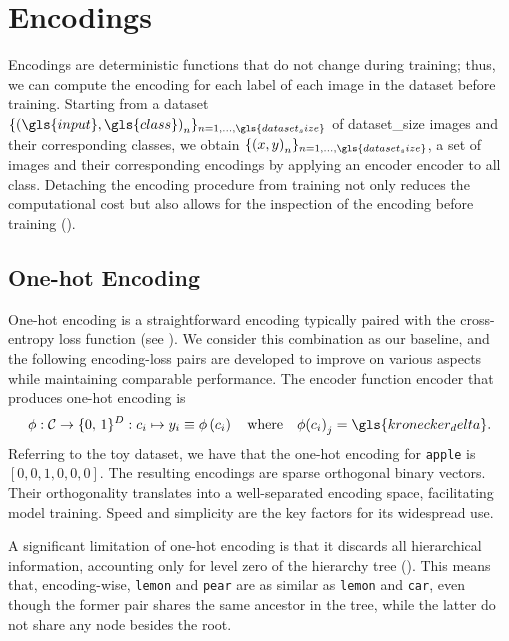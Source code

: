 \section{Encodings}
\label{sec:encodings}

Encodings are deterministic functions that do not change during training; thus, we can compute the encoding for each label of each image in the dataset before training. Starting from a dataset $\{ \left(\gls{input}, \gls{class}\right)_n \}_{n = 1, \ldots, \gls{dataset_size}}$ of \gls{dataset_size} images and their corresponding classes, we obtain $\{ \left(x, y\right)_n \}_{n = 1, \ldots, \gls{dataset_size}}$, a set of images and their corresponding encodings by applying an encoder \gls{encoder} to all \gls{class}.
Detaching the encoding procedure from training not only reduces the computational cost but also allows for the inspection of the encoding before training ().

\subsection{One-hot Encoding}
\label{subsec:one-hot-encoding}

One-hot encoding is a straightforward encoding typically paired with the cross-entropy loss function (see ). We consider this combination as our baseline, and the following encoding-loss pairs are developed to improve on various aspects while maintaining comparable performance.
The encoder function \gls{encoder} that produces one-hot encoding is
\begin{equation}
  \phi: \mathcal{C} \to \{0, \,1\}^{D}
      : c_i \mapsto y_i \equiv \phi \left(c_i\right)
  \quad \text{where} \quad
  \phi{\left(c_i\right)}_j = \gls{kronecker_delta}.
  \label{eq:one-hot-encoding}
\end{equation}
Referring to the toy dataset, we have that the one-hot encoding for \texttt{apple} is $\left[0, 0, 1, 0, 0, 0\right]$. The resulting encodings are sparse orthogonal binary vectors. Their orthogonality translates into a well-separated encoding space, facilitating model training. Speed and simplicity are the key factors for its widespread use.

A significant limitation of one-hot encoding is that it discards all hierarchical information, accounting only for level zero of the hierarchy tree (). This means that, encoding-wise, \texttt{lemon} and \texttt{pear} are as similar as \texttt{lemon} and \texttt{car}, even though the former pair shares the same ancestor in the tree, while the latter do not share any node besides the root.

